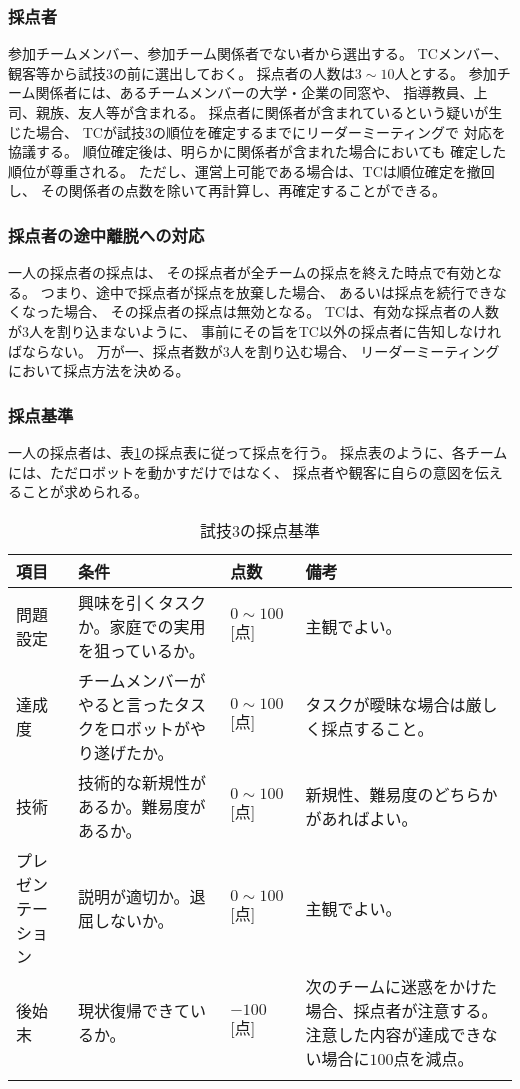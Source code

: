 \documentclass[a4j]{jarticle}
\def\thline{\noalign{\hrule height 1pt}}
\begin{document}
\subsubsection{採点者}

参加チームメンバー、参加チーム関係者でない者から選出する。
TCメンバー、観客等から試技3の前に選出しておく。
採点者の人数は$3\sim10$人とする。
参加チーム関係者には、あるチームメンバーの大学・企業の同窓や、
指導教員、上司、親族、友人等が含まれる。
採点者に関係者が含まれているという疑いが生じた場合、
TCが試技3の順位を確定するまでにリーダーミーティングで
対応を協議する。
順位確定後は、明らかに関係者が含まれた場合においても
確定した順位が尊重される。
ただし、運営上可能である場合は、TCは順位確定を撤回し、
その関係者の点数を除いて再計算し、再確定することができる。

\subsubsection{採点者の途中離脱への対応}

一人の採点者の採点は、
その採点者が全チームの採点を終えた時点で有効となる。
つまり、途中で採点者が採点を放棄した場合、
あるいは採点を続行できなくなった場合、
その採点者の採点は無効となる。
TCは、有効な採点者の人数が$3$人を割り込まないように、
事前にその旨をTC以外の採点者に告知しなければならない。
万が一、採点者数が$3$人を割り込む場合、
リーダーミーティングにおいて採点方法を決める。

\subsubsection{採点基準}

一人の採点者は、表\ref{table:test3score}の採点表に従って採点を行う。
採点表のように、各チームには、ただロボットを動かすだけではなく、
採点者や観客に自らの意図を伝えることが求められる。


\begin{table}
\begin{center}
\caption{試技3の採点基準}
\label{table:test3score}
\begin{tabular}{l|p{4cm}|l|p{4cm}}
\thline
項目 & 条件 & 点数 & 備考\\
\hline
問題設定 & 興味を引くタスクか。家庭での実用を狙っているか。 & $0\sim100$[点] & 主観でよい。\\
達成度 & チームメンバーがやると言ったタスクをロボットがやり遂げたか。 & $0\sim100$[点] & タスクが曖昧な場合は厳しく採点すること。 \\
技術 & 技術的な新規性があるか。難易度があるか。 & $0\sim100$[点]  & 新規性、難易度のどちらかがあればよい。\\
プレゼンテーション & 説明が適切か。退屈しないか。 & $0\sim100$[点] & 主観でよい。\\
後始末 & 現状復帰できているか。 & $-100$[点] & 次のチームに迷惑をかけた場合、採点者が注意する。注意した内容が達成できない場合に$100$点を減点。\\
\thline
\end{tabular}
\end{center}
\end{table}
\end{document}
